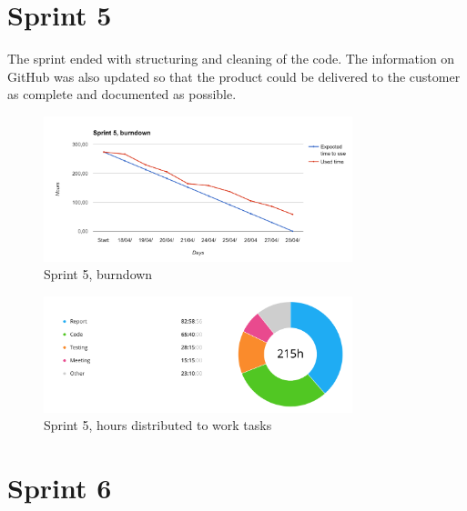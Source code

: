 \section{Sprint 5}
\label{Sprints-sprint5}

The sprint ended with structuring and cleaning of the code. The information on GitHub was also updated so that the product could be delivered to the customer as complete and documented as possible.

\begin{figure}[ht]
\centering
    \includegraphics[width=0.8\textwidth]{fig/sprint5}
\caption{Sprint 5, burndown}
\end{figure}

\begin{figure}[ht]
\centering
    \includegraphics[width=0.8\textwidth]{fig/sprint5-diagram}
\caption{Sprint 5, hours distributed to work tasks}
\end{figure}

\section{Sprint 6}
\label{Sprints-sprint6}

\cleardoublepage